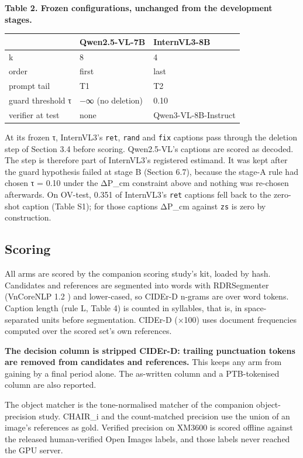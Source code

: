 \textbf{Table 2. Frozen configurations, unchanged from the development stages.}

\begin{longtable}[]{@{}lll@{}}
\toprule\noalign{}
& Qwen2.5-VL-7B & InternVL3-8B \\
\midrule\noalign{}
\endhead
\bottomrule\noalign{}
\endlastfoot
k & 8 & 4 \\
order & first & last \\
prompt tail & T1 & T2 \\
guard threshold τ & −∞ (no deletion) & 0.10 \\
verifier at test & none & Qwen3-VL-8B-Instruct \\
\end{longtable}

At its frozen τ, InternVL3's \texttt{ret}, \texttt{rand} and \texttt{fix} captions pass through the
deletion step of Section 3.4 before scoring. Qwen2.5-VL's captions are scored as decoded. The step
is therefore part of InternVL3's registered estimand. It was kept after the guard hypothesis failed
at stage B (Section 6.7), because the stage-A rule had chosen τ = 0.10 under the ΔP\_cm constraint
above and nothing was re-chosen afterwards. On OV-test, 0.351 of InternVL3's \texttt{ret} captions
fell back to the zero-shot caption (Table S1); for those captions ΔP\_cm against \texttt{zs} is zero
by construction.

\subsection{Scoring}\label{scoring}

All arms are scored by the companion scoring study's kit, loaded by hash. Candidates and references
are segmented into words with RDRSegmenter \citep{Nguyen2018VnCoreNLP} (VnCoreNLP 1.2
\citep{Vu2018VnCoreNLP}) and lower-cased, so CIDEr-D n-grams are over word tokens. Caption length
(rule L, Table 4) is counted in syllables, that is, in space-separated units before segmentation.
CIDEr-D (×100) uses document frequencies computed over the scored set's own references.

\textbf{The decision column is stripped CIDEr-D: trailing punctuation tokens are removed from
candidates and references.} This keeps any arm from gaining by a final period alone. The as-written
column and a PTB-tokenised column are also reported.

The object matcher is the tone-normalised matcher of the companion object-precision study. CHAIR\_i
and the count-matched precision use the union of an image's references as gold. Verified precision
on XM3600 is scored offline against the released human-verified Open Images labels, and those labels
never reached the GPU server.

